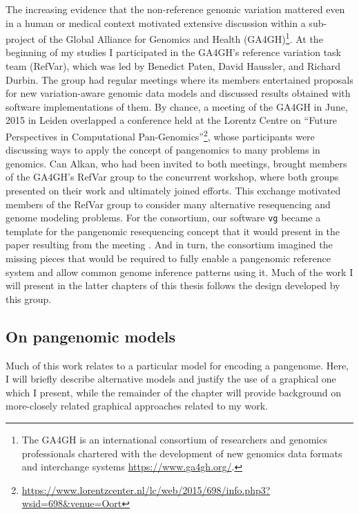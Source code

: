 The increasing evidence that the non-reference genomic variation mattered even in a human or medical context motivated extensive discussion within a sub-project of the Global Alliance for Genomics and Health (GA4GH)\footnote{The GA4GH is an international consortium of researchers and genomics professionals chartered with the development of new genomics data formats and interchange systems \url{https://www.ga4gh.org/}.}.
At the beginning of my studies I participated in the GA4GH's reference variation task team (RefVar), which was led by Benedict Paten, David Haussler, and Richard Durbin.
The group had regular meetings where its members entertained proposals for new variation-aware genomic data models and discussed results obtained with software implementations of them.
By chance, a meeting of the GA4GH in June, 2015 in Leiden overlapped a conference held at the Lorentz Centre on ``Future Perspectives in Computational Pan-Genomics''\footnote{\url{https://www.lorentzcenter.nl/lc/web/2015/698/info.php3?wsid=698\&venue=Oort}}, whose participants were discussing ways to apply the concept of pangenomics to many problems in genomics.
Can Alkan, who had been invited to both meetings, brought members of the GA4GH's RefVar group to the concurrent workshop, where both groups presented on their work and ultimately joined efforts.
This exchange motivated members of the RefVar group to consider many alternative resequencing and genome modeling problems.
For the consortium, our software {\tt vg} became a template for the pangenomic resequencing concept that it would present in the paper resulting from the meeting \cite{computational2016computational}.
And in turn, the consortium imagined the missing pieces that would be required to fully enable a pangenomic reference system and allow common genome inference patterns using it.
Much of the work I will present in the latter chapters of this thesis follows the design developed by this group.


\subsection{On pangenomic models}

\label{sec:on_pangenomic_models}

Much of this work relates to a particular model for encoding a pangenome. Here, I will briefly describe alternative models and justify the use of a graphical one which I present, while the remainder of the chapter will provide background on more-closely related graphical approaches related to my work.

